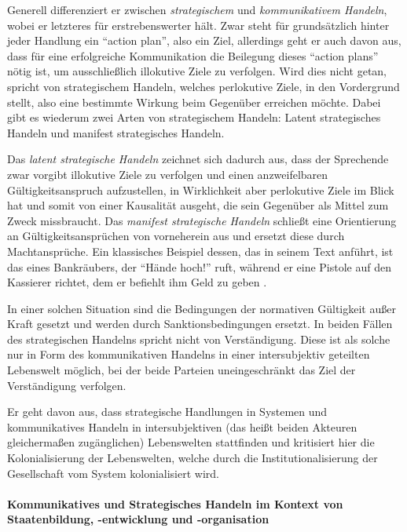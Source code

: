 Generell differenziert er zwischen \emph{strategischem} und \emph{kommunikativem Handeln}, wobei er letzteres für erstrebenswerter hält.
Zwar steht für \citeauthor{Habermas-1998-aa} grundsätzlich hinter jeder Handlung ein ``action plan'', also ein Ziel, allerdings geht er auch davon aus, dass für eine erfolgreiche Kommunikation die Beilegung dieses ``action plans'' nötig ist, um ausschließlich illokutive Ziele zu verfolgen.
Wird dies nicht getan, spricht \citeauthor{Habermas-1998-aa} von strategischem Handeln, welches perlokutive Ziele, in den Vordergrund stellt, also eine bestimmte Wirkung beim Gegenüber erreichen möchte.
Dabei gibt es wiederum zwei Arten von strategischem Handeln:
Latent strategisches Handeln und manifest strategisches Handeln.

Das \emph{latent strategische Handeln} zeichnet sich dadurch aus, dass der Sprechende zwar vorgibt illokutive Ziele zu verfolgen und einen anzweifelbaren Gültigkeitsanspruch aufzustellen, in Wirklichkeit aber perlokutive Ziele im Blick hat und somit von einer Kausalität ausgeht, die sein Gegenüber als Mittel zum Zweck missbraucht.
Das \emph{manifest strategische Handeln} schließt eine Orientierung an Gültigkeitsansprüchen von vorneherein aus und ersetzt diese durch Machtansprüche.
Ein klassisches Beispiel dessen, das \citeauthor{Habermas-1998-aa} in seinem Text anführt, ist das eines Bankräubers, der ``Hände hoch!'' ruft, während er eine Pistole auf den Kassierer richtet, dem er befiehlt ihm Geld zu geben \parencite[vgl.][225]{Habermas-1998-aa}.

In einer solchen Situation sind die Bedingungen der normativen Gültigkeit außer Kraft gesetzt und werden durch Sanktionsbedingungen ersetzt.
In beiden Fällen des strategischen Handelns spricht \citeauthor{Habermas-1998-aa} nicht von Verständigung.
Diese ist als solche nur in Form des kommunikativen Handelns in einer intersubjektiv geteilten Lebenswelt möglich, bei der beide Parteien uneingeschränkt das Ziel der Verständigung verfolgen.

Er geht davon aus, dass strategische Handlungen in Systemen und kommunikatives Handeln in intersubjektiven (das heißt beiden Akteuren gleichermaßen zugänglichen) Lebenswelten stattfinden und kritisiert hier die Kolonialisierung der Lebenswelten, welche durch die Institutionalisierung der Gesellschaft vom System kolonialisiert wird.


\paragraph{Kommunikatives und Strategisches Handeln im Kontext von Staatenbildung, -entwicklung und -organisation}

